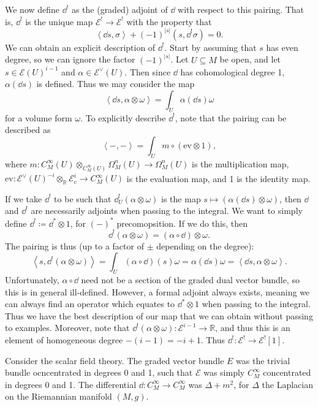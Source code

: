 \begin{remark}
	
	We now define $\dd ^!$ as the (graded) adjoint of $\dd $ with respect to this pairing. That is, $\dd ^!$ is the unique map $\mathcal{E} ^! \to \mathcal{E} ^!$ with the property that
	\[
		\left\langle \dd s,\sigma  \right\rangle +(-1)^{\left| s \right| } (s,\dd^! \sigma )=0
	.\]
	We can obtain an explicit description of $\dd ^!$. Start by assuming that $s$ has even degree, so we can ignore the factor $(-1)^{\left| s \right| } $. Let $U\subseteq M$ be open, and let $s\in \mathcal{E} (U)^{i-1} $ and $\alpha\in \mathcal{E} ^{\vee } (U)$. Then since $\dd $ has cohomological degree 1, $\alpha (\dd s)$ is defined. Thus we may consider the map
	\[
		\left\langle \dd s,\alpha \otimes \omega  \right\rangle =\int_{U} \alpha (\dd s)\omega 
	\]
	for a volume form $\omega $. To explicitly describe $\dd ^!$, note that the pairing can be described as
	\[
		\left\langle -,-  \right\rangle =\int_{U} m\circ (\mathrm{ev} \otimes 1)
	,\]
	where $m : C^\infty _M(U)\otimes_{C^\infty_M(U)} \Omega _M^n(U) \to \Omega ^n_M(U)$ is the multiplication map, $\mathrm{ev} : \mathcal{E}^\vee (U)^{-i} \otimes_\mathbb{R} \mathcal{E} _c^i \to C^\infty _M(U)$ is the evaluation map, and 1 is the identity map.

	If we take $\dd ^!$ to be such that $\dd ^!_U(\alpha \otimes \omega )$ is the map $s\mapsto (\alpha (\dd s)\otimes \omega )$, then $\dd $ and $\dd ^!$ are necessarily adjoints when passing to the integral. We want to simply define $\dd ^!\coloneqq \dd ^*\otimes 1$, for $(-)^*$ precomopsition. If we do this, then
	\[
		\dd ^!(\alpha \otimes \omega ) = (\alpha \circ \dd )\otimes \omega 
	.\]
	The pairing is thus (up to a factor of $\pm$ depending on the degree):
	\[
		\left\langle s,\dd^!(\alpha \otimes \omega ) \right\rangle =\int_{U} (\alpha \circ \dd )(s)\omega = \alpha (\dd s)\omega =\left\langle \dd s,\alpha \otimes \omega  \right\rangle 
	.\]
	Unfortunately, $\alpha \circ \dd $ need not be a section of the graded dual vector bundle, so this is in general ill-defined. However, a formal adjoint always exists, meaning we can always find an operator which equates to $\dd ^* \otimes 1$ when passing to the integral. Thus we have the best description of our map that we can obtain without passing to examples. Moreover, note that $\dd ^!(\alpha \otimes \omega ): \mathcal{E} ^{i-1}  \to \mathbb{R} $, and thus this is an element of homogeneous degree $-(i-1) = -i+1$. Thus $\dd ^! : \mathcal{E} ^! \to \mathcal{E} ^![1]$.


	Consider the scalar field theory. The graded vector bundle $E$ was the trivial bundle ocncentrated in degrees 0 and 1, such that $\mathcal{E} $ was simply $C^\infty_M$ concentrated in degrees 0 and 1. The differential $\dd : C^\infty _M \to C^\infty _M$ was $\Delta +m^2$, for $\Delta $ the Laplacian on the Riemannian manifold $(M,g)$.


\end{remark}

